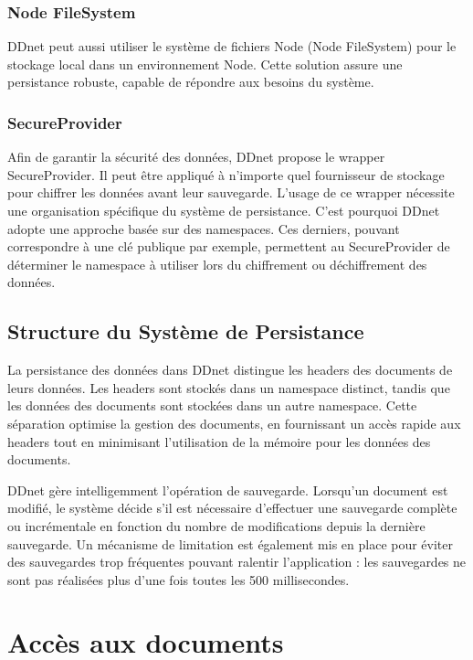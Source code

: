 \subsubsection{Node FileSystem}

DDnet peut aussi utiliser le système de fichiers Node (Node FileSystem) pour le stockage local dans un environnement Node. Cette solution assure une persistance robuste, capable de répondre aux besoins du système.

\subsubsection{SecureProvider}

Afin de garantir la sécurité des données, DDnet propose le wrapper SecureProvider. Il peut être appliqué à n'importe quel fournisseur de stockage pour chiffrer les données avant leur sauvegarde. L'usage de ce wrapper nécessite une organisation spécifique du système de persistance. C'est pourquoi DDnet adopte une approche basée sur des namespaces. Ces derniers, pouvant correspondre à une clé publique par exemple, permettent au SecureProvider de déterminer le namespace à utiliser lors du chiffrement ou déchiffrement des données.

\subsection{Structure du Système de Persistance}

La persistance des données dans DDnet distingue les headers des documents de leurs données. Les headers sont stockés dans un namespace distinct, tandis que les données des documents sont stockées dans un autre namespace. Cette séparation optimise la gestion des documents, en fournissant un accès rapide aux headers tout en minimisant l'utilisation de la mémoire pour les données des documents.

DDnet gère intelligemment l'opération de sauvegarde. Lorsqu'un document est modifié, le système décide s'il est nécessaire d'effectuer une sauvegarde complète ou incrémentale en fonction du nombre de modifications depuis la dernière sauvegarde. Un mécanisme de limitation est également mis en place pour éviter des sauvegardes trop fréquentes pouvant ralentir l'application : les sauvegardes ne sont pas réalisées plus d'une fois toutes les 500 millisecondes.

\section{Accès aux documents}

